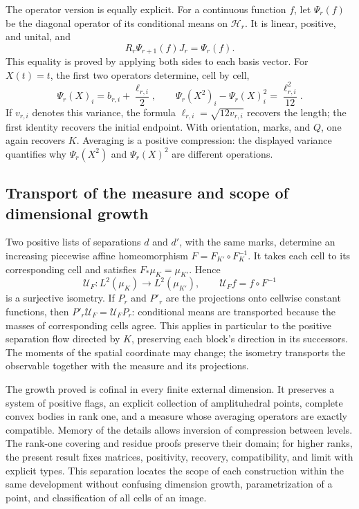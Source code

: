 The operator version is equally explicit. For a continuous function
\(f\), let \(\Psi_r(f)\) be the diagonal operator of its conditional
means on \(\mathcal H_r\). It is linear, positive, and unital, and
\[
 R_r\Psi_{r+1}(f)J_r=\Psi_r(f).
\]
This equality is proved by applying both sides to each basis vector.
For \(X(t)=t\), the first two operators determine, cell by cell,
\[
 \Psi_r(X)_i=b_{r,i}+\frac{\ell_{r,i}}2,\qquad
 \Psi_r(X^2)_i-\Psi_r(X)_i^2=\frac{\ell_{r,i}^2}{12}.
\]
If \(v_{r,i}\) denotes this variance, the formula
\(\ell_{r,i}=\sqrt{12v_{r,i}}\) recovers the length; the first
identity recovers the initial endpoint. With orientation, marks, and
\(Q\), one again recovers \(K\). Averaging is a positive compression:
the displayed variance quantifies why \(\Psi_r(X^2)\) and
\(\Psi_r(X)^2\) are different operations.

\subsection{Transport of the measure and scope of dimensional growth}

Two positive lists of separations \(d\) and \(d'\), with the same
marks, determine an increasing piecewise affine homeomorphism
\(F=F_{K'}\circ F_K^{-1}\). It takes each cell to its corresponding
cell and satisfies \(F_*\mu_K=\mu_{K'}\). Hence
\[
 \mathcal U_F:L^2(\mu_K)\longrightarrow L^2(\mu_{K'}),
 \qquad\mathcal U_F f=f\circ F^{-1}
\]
is a surjective isometry. If \(P_r\) and \(P'_r\) are the
projections onto cellwise constant functions, then
\(P'_r\mathcal U_F=\mathcal U_FP_r\): conditional means are
transported because the masses of corresponding cells agree.
This applies in particular to the positive separation flow directed
by \(K\), preserving each block's direction in its successors. The
moments of the spatial coordinate may change; the isometry transports
the observable together with the measure and its projections.

The growth proved is cofinal in every finite external dimension.
It preserves a system of positive flags, an explicit collection of
amplituhedral points, complete convex bodies in rank one, and a measure
whose averaging operators are exactly compatible. Memory of the details
allows inversion of compression between levels. The rank-one covering
and residue proofs preserve their domain; for higher ranks, the present
result fixes matrices, positivity, recovery, compatibility, and limit
with explicit types. This separation locates the scope of each
construction within the same development without confusing dimension
growth, parametrization of a point, and classification of all cells
of an image.
